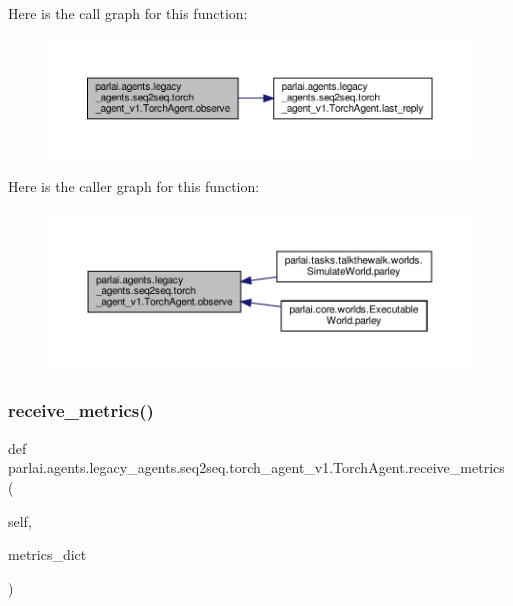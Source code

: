 Here is the call graph for this function\+:
\nopagebreak
\begin{figure}[H]
\begin{center}
\leavevmode
\includegraphics[width=350pt]{classparlai_1_1agents_1_1legacy__agents_1_1seq2seq_1_1torch__agent__v1_1_1TorchAgent_a0eb23a78aea413ae4f90ce0628179920_cgraph}
\end{center}
\end{figure}
Here is the caller graph for this function\+:
\nopagebreak
\begin{figure}[H]
\begin{center}
\leavevmode
\includegraphics[width=350pt]{classparlai_1_1agents_1_1legacy__agents_1_1seq2seq_1_1torch__agent__v1_1_1TorchAgent_a0eb23a78aea413ae4f90ce0628179920_icgraph}
\end{center}
\end{figure}
\mbox{\label{classparlai_1_1agents_1_1legacy__agents_1_1seq2seq_1_1torch__agent__v1_1_1TorchAgent_af97699a6b03a17969830db378f09cac4}} 
\subsubsection{\texorpdfstring{receive\+\_\+metrics()}{receive\_metrics()}}
{\footnotesize\ttfamily def parlai.\+agents.\+legacy\+\_\+agents.\+seq2seq.\+torch\+\_\+agent\+\_\+v1.\+Torch\+Agent.\+receive\+\_\+metrics (\begin{DoxyParamCaption}\item[{}]{self,  }\item[{}]{metrics\+\_\+dict }\end{DoxyParamCaption})}

